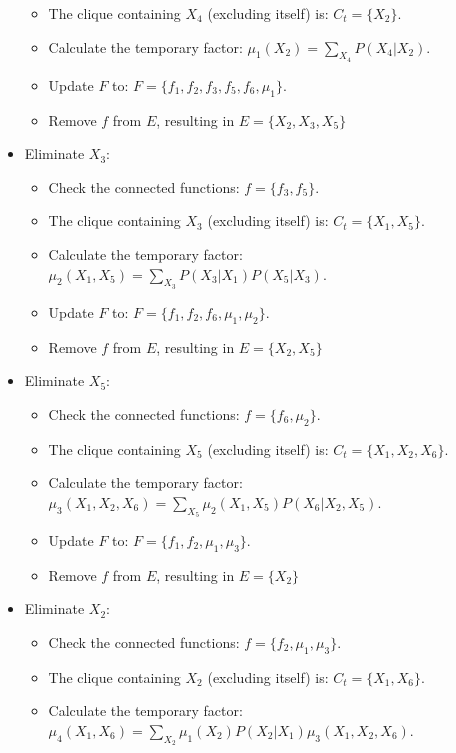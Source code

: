 \begin{example}
\begin{itemize}
\begin{itemize}
                \item The clique containing $X_4$ (excluding itself) is: $C_t=\{X_2\}$. 
                \item Calculate the temporary factor: $\mu_1(X_2)=\sum_{X_4}P(X_4|X_2)$. 
                \item Update $F$ to: $F=\{f_1,f_2,f_3,f_5,f_6,\mu_1\}$. 
                \item Remove $f$ from $E$, resulting in $E=\{X_2,X_3,X_5\}$
            \end{itemize}
        \item Eliminate $X_3$: 
            \begin{itemize}
                \item Check the connected functions: $f=\{f_3,f_5\}$. 
                \item The clique containing $X_3$ (excluding itself) is: $C_t=\{X_1,X_5\}$. 
                \item Calculate the temporary factor: $\mu_2(X_1,X_5)=\sum_{X_3}P(X_3|X_1)P(X_5|X_3)$. 
                \item Update $F$ to: $F=\{f_1,f_2,f_6,\mu_1,\mu_2\}$. 
                \item Remove $f$ from $E$, resulting in $E=\{X_2,X_5\}$
            \end{itemize}
        \item Eliminate $X_5$: 
            \begin{itemize}
                \item Check the connected functions: $f=\{f_6,\mu_2\}$. 
                \item The clique containing $X_5$ (excluding itself) is: $C_t=\{X_1,X_2,X_6\}$. 
                \item Calculate the temporary factor: $\mu_3(X_1,X_2,X_6)=\sum_{X_5}\mu_2(X_1,X_5)P(X_6|X_2,X_5)$. 
                \item Update $F$ to: $F=\{f_1,f_2,\mu_1,\mu_3\}$. 
                \item Remove $f$ from $E$, resulting in $E=\{X_2\}$
            \end{itemize}
        \item Eliminate $X_2$: 
            \begin{itemize}
                \item Check the connected functions: $f=\{f_2,\mu_1,\mu_3\}$. 
                \item The clique containing $X_2$ (excluding itself) is: $C_t=\{X_1,X_6\}$. 
                \item Calculate the temporary factor: $\mu_4(X_1,X_6)=\sum_{X_2}\mu_1(X_2)P(X_2|X_1)\mu_3(X_1,X_2,X_6)$. 

\end{itemize}
\end{itemize}
\end{example}
